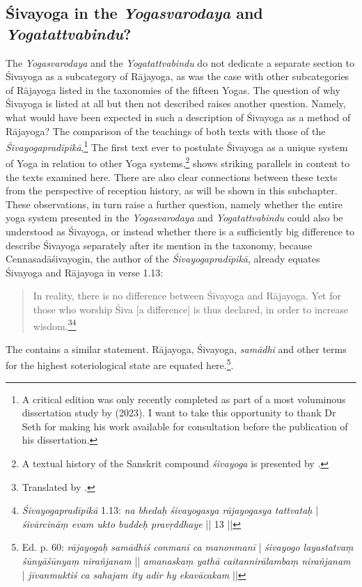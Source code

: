 \subsection{Śivayoga in the \textit{Yogasvarodaya} and \textit{Yogatattvabindu}?}
\label{sivayogaintro2}
The \textit{Yogasvarodaya} and the \textit{Yogatattvabindu} do not dedicate a separate section to Śivayoga as a subcategory of Rājayoga, as was the case with other subcategories of Rājayoga listed in the taxonomies of the fifteen Yogas. The question of why Śivayoga is listed at all but then not described raises another question. Namely, what would have been expected in such a description of Śivayoga as a method of Rājayoga? The comparison of the teachings of both texts with those of the \textit{Śivayogapradīpikā},\footnote{A critical edition was only recently completed as part of a most voluminous dissertation study by \citeauthor{powell2023} (2023). I want to take this opportunity to thank Dr Seth \citeauthor{powell2023} for making his work available for consultation before the publication of his dissertation.} The first text ever to postulate Śivayoga as a unique system of Yoga in relation to other Yoga systems,\footnote{A textual history of the Sanskrit compound \textit{śivayoga} is presented by \citeauthor[2023: 48-57]{powell2023}.} shows striking parallels in content to the texts examined here. There are also clear connections between these texts from the perspective of reception history, as will be shown in this subchapter. These observations, in turn raise a further question, namely whether the entire yoga system presented in the \textit{Yogasvarodaya} and \textit{Yogatattvabindu} could also be understood as Śivayoga, or instead whether there is a sufficiently big difference to describe Śivayoga separately after its mention in the taxonomy, because Cennasadāśivayogin, the author of the \textit{Śivayogapradīpikā}, already equates Śivayoga and Rājayoga in verse 1.13:
\begin{quote}
In reality, there is no difference between Śivayoga and Rājayoga. Yet for those who worship Śiva [a difference] is thus declared, in order to increase wisdom.\footnote{Translated by \citeauthor[2023: 315]{powell2023}.}\footnote{\textit{Śivayogapradīpikā} 1.13: \textit{na bhedaḥ śivayogasya rājayogasya tattvataḥ} | \textit{śivārcināṃ evam ukto buddeḥ pravṛddhaye} || 13 ||} 
\end{quote}
The  contains a similar statement. Rājayoga, Śivayoga, \textit{samādhi} and other terms for the highest soteriological state are equated here.\footnote{ Ed. p. 60: \textit{rājayogaḥ samādhiś conmanī ca manonmanī} | \textit{śivayogo layastatvaṃ śūnyāśūnyaṃ nirañjanam} || \textit{amanaskaṃ yathā caitannirālambaṃ nirañjanam} | \textit{jīvanmuktiś ca sahajam ity adir hy ekavācakam} ||}.

